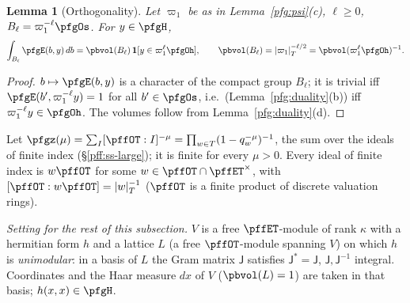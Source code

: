 \documentclass[10pt]{amsart}
\newtheorem{lemma}[theorem]{Lemma}
\theoremstyle{definition}
\theoremstyle{remark}
\begin{document}
\begin{lemma}[Orthogonality]\label{pfg:orth}
Let $\varpi_1$ be as in Lemma~\ref{pfg:psi}(c), $\ell\ge0$, $B_\ell=\varpi_1^{-\ell}\pfgOs$. For $y\in\pfgH$,
\[
\int_{B_\ell}\pfgE(b,y)\,db=\pbvol(B_\ell)\,\mathbf 1[y\in\varpi_1^{\ell}\pfgOh],\qquad
\pbvol(B_\ell)=|\varpi_1|_T^{-\ell/2}=\pbvol(\varpi_1^\ell\pfgOh)^{-1}.
\]
\end{lemma}
\begin{proof}
$b\mapsto\pfgE(b,y)$ is a character of the compact group $B_\ell$; it is trivial iff $\pfgE(b',\varpi_1^{-\ell}y)=1$
for all $b'\in\pfgOs$, i.e.\ (Lemma~\ref{pfg:duality}(b)) iff $\varpi_1^{-\ell}y\in\pfgOh$. The volumes follow from
Lemma~\ref{pfg:duality}(d).
\end{proof}

Let $\pfgz(\mu)=\sum_I[\pffOT:I]^{-\mu}=\prod_{w\in T}(1-q_w^{-\mu})^{-1}$, the sum over the ideals of finite index
(\S\ref{pff:ss-large}); it is finite for every $\mu>0$. Every ideal of finite index is $w\pffOT$ for some
$w\in\pffOT\cap\pffET^\times$, with $[\pffOT:w\pffOT]=|w|_T^{-1}$ ($\pffOT$ is a finite product of discrete valuation
rings).

\emph{Setting for the rest of this subsection.} $V$ is a free $\pffET$-module of rank $\kappa$ with a hermitian form
$h$ and a lattice $L$ (a free $\pffOT$-module spanning $V$) on which $h$ is \emph{unimodular}: in a basis of $L$ the
Gram matrix $\mathsf J$ satisfies $\mathsf J^*=\mathsf J$, $\mathsf J,\mathsf J^{-1}$ integral. Coordinates and the
Haar measure $dx$ of $V$ ($\pbvol(L)=1$) are taken in that basis; $h(x,x)\in\pfgH$.
\end{document}
